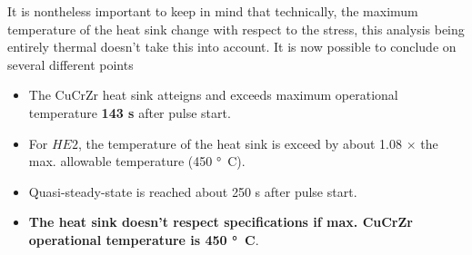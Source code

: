 \normalsize{\indent  It is nontheless important to keep in mind that technically, the maximum temperature of the heat sink change with respect to the stress, this analysis being entirely thermal doesn't take this into account. It is now possible to conclude on several different points
\begin{itemize}
    \item The \acrshort{CuCrZr} heat sink atteigns and exceeds maximum operational temperature {\bfseries 143 \unit{s} } after pulse start.
    \item For $HE2$, the temperature of the heat sink is exceed by about 1.08 $\times$ the max. allowable temperature (450 \unit{\si{\degree}C}).
    \item Quasi-steady-state is reached about 250 \unit{s} after pulse start.
    \item {\bfseries The heat sink doesn't respect specifications if max. \acrshort{CuCrZr} operational temperature is 450 \unit{\si{\degree}C}}.
\end{itemize}
}
